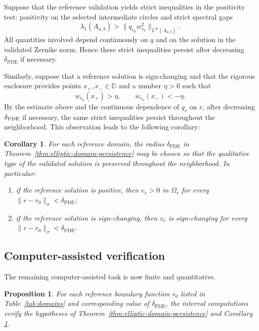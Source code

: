 \documentclass[11pt,a4paper]{amsart}
\newtheorem{proposition}[theorem]{Proposition}
\newtheorem{corollary}[theorem]{Corollary}
\begin{document}
Suppose that the reference validation yields strict inequalities in
the positivity test: positivity on the selected intermediate circles
and strict spectral gaps
\[
\lambda_1(A_{a,b})
>
\|q_{r_0}w_{r_0}^2\|_{L^\infty(A_{a,b})}.
\]
All quantities involved depend continuously on $q$ and on the
solution in the validated Zernike norm. Hence these strict
inequalities persist after decreasing
$\delta_{\mathrm{PDE}}$ if necessary.

Similarly, suppose that a reference solution is sign-changing and
that the rigorous enclosure provides points $x_+,x_-\in\mathbb D$
and a number $\eta>0$ such that
\[
w_{r_0}(x_+)>\eta,
\qquad
w_{r_0}(x_-)<-\eta.
\]
By the estimate above and the continuous dependence of \(q_r\) on \(r\), after decreasing \(\delta_{\rm PDE}\) if necessary, the same strict inequalities persist throughout the neighborhood.
This observation leads to the following corollary:
\begin{corollary}\label{cor:qualitative-persistence}
	For each reference domain, the radius
	$\delta_{\mathrm{PDE}}$ in
	Theorem~\ref{thm:elliptic-domain-persistence} may be chosen so that
	the qualitative type of the validated solution is preserved
	throughout the neighborhood. In particular:
	\begin{enumerate}
		\item if the reference solution is positive, then $v_r>0$ in
		$\Omega_r$ for every
		$\|r-r_0\|_\sigma<\delta_{\mathrm{PDE}}$;
		
		\item if the reference solution is sign-changing, then $v_r$ is
		sign-changing for every
		$\|r-r_0\|_\sigma<\delta_{\mathrm{PDE}}$.
	\end{enumerate}
\end{corollary}


\subsection{Computer-assisted verification}

The remaining computer-assisted task is now finite and quantitative.
\begin{proposition}\label{prop:validated-elliptic}
	For each reference boundary function $r_0$ listed in
	Table~\ref{tab:domains} and corresponding value of $\delta_\mathrm{PDE}$, the interval computations verify the	hypotheses of Theorem~\ref{thm:elliptic-domain-persistence} and Corollary \ref{cor:qualitative-persistence}.
\end{proposition}
\end{document}

